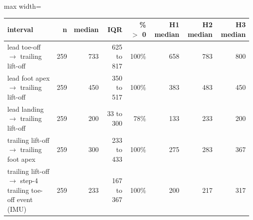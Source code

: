 \begin{adjustbox}{max width=\textwidth}
{\footnotesize
\begin{tabular}{lrrrrrrr}
\toprule
\textbf{interval} & \textbf{n} & \textbf{median} & \textbf{IQR} & \textbf{\% $>$ 0} & \textbf{H1 median} & \textbf{H2 median} & \textbf{H3 median} \\
\midrule
lead toe-off $\rightarrow$ trailing lift-off & 259 & 733 & 625 to 817 & 100\% & 658 & 783 & 800 \\
lead foot apex $\rightarrow$ trailing lift-off & 259 & 450 & 350 to 517 & 100\% & 383 & 483 & 450 \\
lead landing $\rightarrow$ trailing lift-off & 259 & 200 & 33 to 300 & 78\% & 133 & 233 & 200 \\
trailing lift-off $\rightarrow$ trailing foot apex & 259 & 300 & 233 to 433 & 100\% & 275 & 283 & 367 \\
trailing lift-off $\rightarrow$ step-4 trailing toe-off event (IMU) & 259 & 233 & 167 to 367 & 100\% & 200 & 217 & 317 \\
\bottomrule
\end{tabular}
}
\end{adjustbox}
